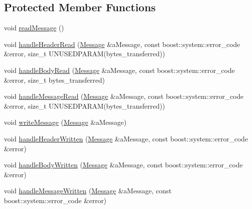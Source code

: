 \subsection*{Protected Member Functions}
\begin{DoxyCompactItemize}
\item 
void \hyperlink{class_messaging_1_1_session_a9b5aa90c447db3b432751f453565e84b}{read\+Message} ()
\item 
void \hyperlink{class_messaging_1_1_session_a1ce6c51bea887b0745318de8de202af7}{handle\+Header\+Read} (\hyperlink{struct_messaging_1_1_message}{Message} \&a\+Message, const boost\+::system\+::error\+\_\+code \&error, size\+\_\+t U\+N\+U\+S\+E\+D\+P\+A\+R\+AM(bytes\+\_\+transferred))
\item 
void \hyperlink{class_messaging_1_1_session_a9b2379db03dd4b22896df3b6891509a9}{handle\+Body\+Read} (\hyperlink{struct_messaging_1_1_message}{Message} \&a\+Message, const boost\+::system\+::error\+\_\+code \&error, size\+\_\+t bytes\+\_\+transferred)
\item 
void \hyperlink{class_messaging_1_1_session_a224c7c9cc62b4b9e3ccd21c3121f9b03}{handle\+Message\+Read} (\hyperlink{struct_messaging_1_1_message}{Message} \&a\+Message, const boost\+::system\+::error\+\_\+code \&error, size\+\_\+t U\+N\+U\+S\+E\+D\+P\+A\+R\+AM(bytes\+\_\+transferred))
\item 
void \hyperlink{class_messaging_1_1_session_af6693149abfd302fd6285d99a0131f18}{write\+Message} (\hyperlink{struct_messaging_1_1_message}{Message} \&a\+Message)
\item 
void \hyperlink{class_messaging_1_1_session_aa6bb0133b721e77c31411cccc1eb6c40}{handle\+Header\+Written} (\hyperlink{struct_messaging_1_1_message}{Message} \&a\+Message, const boost\+::system\+::error\+\_\+code \&error)
\item 
void \hyperlink{class_messaging_1_1_session_a42e7eb7f1e5d41861417d03dcb5419e7}{handle\+Body\+Written} (\hyperlink{struct_messaging_1_1_message}{Message} \&a\+Message, const boost\+::system\+::error\+\_\+code \&error)
\item 
void \hyperlink{class_messaging_1_1_session_a4ad739e7dea45e860feae03c2ae728b2}{handle\+Message\+Written} (\hyperlink{struct_messaging_1_1_message}{Message} \&a\+Message, const boost\+::system\+::error\+\_\+code \&error)
\end{DoxyCompactItemize}
